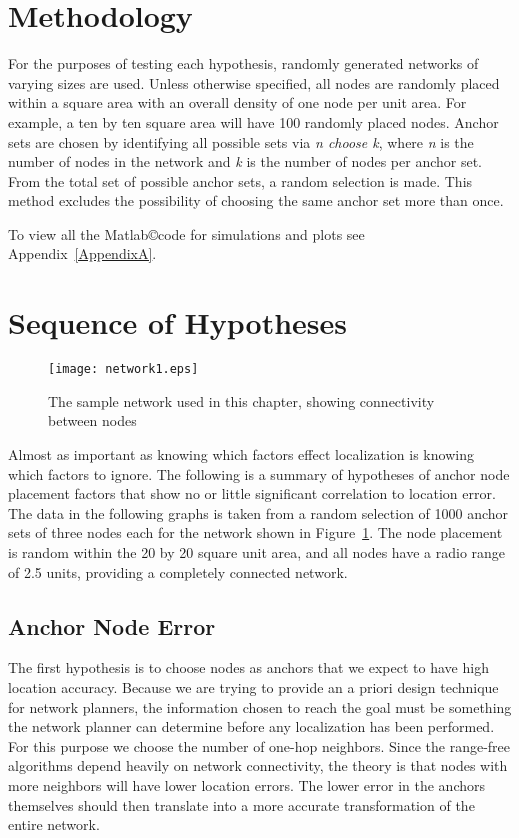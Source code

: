 \section{Methodology}
For the purposes of testing each hypothesis, randomly generated networks of varying sizes are used.  Unless otherwise specified, all nodes are randomly placed within a square area with an overall density of one node per unit area.  For example, a ten by ten square area will have 100 randomly placed nodes.  Anchor sets are chosen by identifying all possible sets via \emph{n choose k}, where \emph{n} is the number of nodes in the network and \emph{k} is the number of nodes per anchor set.  From the total set of possible anchor sets, a random selection is made.  This method excludes the possibility of choosing the same anchor set more than once.

To view all the Matlab\copyright code for simulations and plots see Appendix~\ref{AppendixA}.

\section{Sequence of Hypotheses}
\begin{figure}
	\centering
		\texttt{[image: network1.eps]}
	\caption{The sample network used in this chapter, showing connectivity between nodes}
	\label{fig:HypothesesNetwork}
\end{figure}

Almost as important as knowing which factors effect localization is knowing which factors to ignore. The following is a summary of hypotheses of anchor node placement factors that show no or little significant correlation to location error.  The data in the following graphs is taken from a random selection of 1000 anchor sets of three nodes each for the network shown in Figure~\ref{fig:HypothesesNetwork}.  The node placement is random within the 20 by 20 square unit area, and all nodes have a radio range of 2.5 units, providing a completely connected network.

\subsection{Anchor Node Error}
The first hypothesis is to choose nodes as anchors that we expect to have high location accuracy. Because we are trying to provide an a priori design technique for network planners, the information chosen to reach the goal must be something the network planner can determine before any localization has been performed.  For this purpose we choose the number of one-hop neighbors.  Since the range-free algorithms depend heavily on network connectivity, the theory is that nodes with more neighbors will have lower location errors.  The lower error in the anchors themselves should then translate into a more accurate transformation of the entire network.

